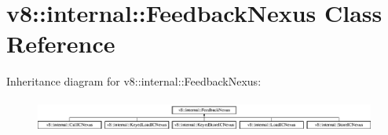 \hypertarget{classv8_1_1internal_1_1_feedback_nexus}{}\section{v8\+:\+:internal\+:\+:Feedback\+Nexus Class Reference}
\label{classv8_1_1internal_1_1_feedback_nexus}
Inheritance diagram for v8\+:\+:internal\+:\+:Feedback\+Nexus\+:\begin{figure}[H]
\begin{center}
\leavevmode
\includegraphics[height=1.114428cm]{classv8_1_1internal_1_1_feedback_nexus}
\end{center}
\end{figure}
